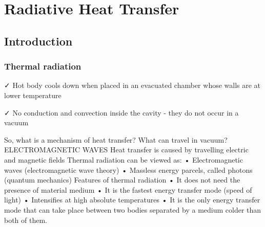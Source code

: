 \chapter{Radiative Heat Transfer}
\section{Introduction}
\subsection{Thermal radiation}
✓ Hot body cools down when placed in an evacuated chamber whose walls are at lower temperature

✓ No conduction and convection inside the cavity - they do not occur in a vacuum

So, what is a mechanism of heat transfer?
What can travel in vacuum?
ELECTROMAGNETIC WAVES
Heat transfer is caused by travelling electric and magnetic fields
Thermal radiation can be viewed as:
• Electromagnetic waves (electromagnetic wave theory)
• Massless energy parcels, called photons (quantum
mechanics)
Features of thermal radiation
• It does not need the presence of material medium
• It is the fastest energy transfer mode (speed of light)
• Intensifies at high absolute temperatures
• It is the only energy transfer mode that can take place
between two bodies separated by a medium colder
than both of them.
